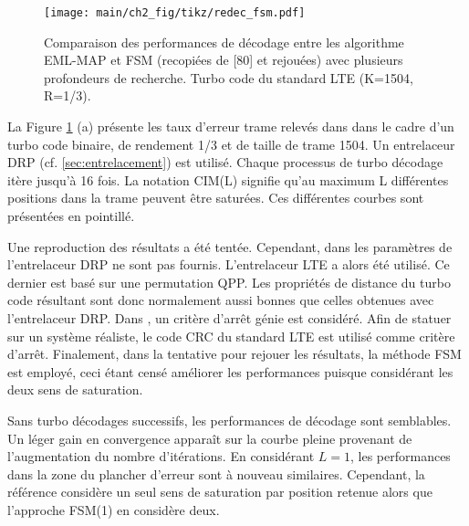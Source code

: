 \begin{figure}[!h]
	\centering
	\texttt{[image: main/ch2\_fig/tikz/redec\_fsm.pdf]}
	\vspace*{.3cm}
	\caption{\label{fig:fsm}Comparaison des performances de décodage entre les algorithme EML-MAP et FSM (recopiées de [80] et rejouées) avec plusieurs 
	profondeurs de recherche. Turbo code du standard LTE (K=1504, R=1/3).}
\end{figure}

La Figure \ref{fig:fsm} (a) présente les taux d'erreur trame relevés dans \cite{cim} dans le cadre d'un turbo code binaire,
de rendement 1/3 et de taille de trame 1504. Un entrelaceur DRP (cf. \ref{sec:entrelacement})  est utilisé. Chaque processus de turbo décodage itère 
jusqu'à 16 fois. La notation CIM(L) signifie qu'au maximum L différentes positions dans la trame peuvent être saturées. 
Ces différentes courbes sont présentées en pointillé.

Une reproduction des résultats a été tentée. Cependant, dans \cite{cim} les paramètres de l'entrelaceur DRP ne sont pas fournis. 
L'entrelaceur LTE a alors été utilisé. Ce dernier est basé sur une permutation QPP. Les propriétés de distance du turbo 
code résultant sont donc normalement aussi bonnes que celles obtenues avec l'entrelaceur DRP. Dans \cite{cim}, un critère 
d'arrêt génie est considéré. Afin de statuer sur un système réaliste, le code CRC du standard LTE est utilisé comme 
critère d'arrêt. 
Finalement, dans la tentative pour rejouer les résultats, la méthode FSM \cite{fsm} est employé, ceci étant censé améliorer les performances puisque considérant les deux sens de saturation.

Sans turbo décodages successifs, les performances de décodage sont semblables. Un léger gain en convergence apparaît 
sur  la courbe pleine provenant de l'augmentation du nombre d'itérations. En considérant $L=1$, les performances dans la
zone du plancher d'erreur sont à nouveau similaires. Cependant, la référence considère un seul sens de saturation par position
retenue alors que l'approche FSM(1) en considère deux. 

